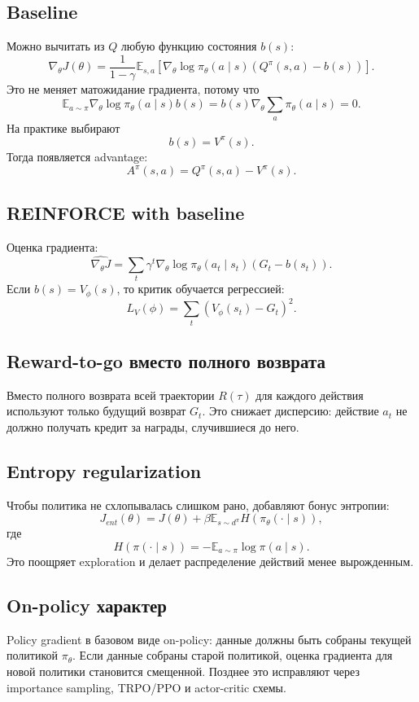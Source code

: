 \documentclass[11pt,a4paper]{article}
\newcommand{\E}{\mathbb{E}}
\newcommand{\1}{\mathbf{1}}
\begin{document}
\subsection*{Baseline}
Можно вычитать из $Q$ любую функцию состояния $b(s)$:
\[
    \nabla_\theta J(\theta)=\frac1{1-\gamma}\E_{s,a}\left[\nabla_\theta\log\pi_\theta(a\mid s)(Q^\pi(s,a)-b(s))\right].
\]
Это не меняет матожидание градиента, потому что
\[
    \E_{a\sim\pi}\nabla_\theta\log\pi_\theta(a\mid s)b(s)=b(s)\nabla_\theta\sum_a\pi_\theta(a\mid s)=0.
\]
На практике выбирают
\[
    b(s)=V^\pi(s).
\]
Тогда появляется advantage:
\[
    A^\pi(s,a)=Q^\pi(s,a)-V^\pi(s).
\]

\subsection*{REINFORCE with baseline}
Оценка градиента:
\[
    \widehat{\nabla_\theta J}=\sum_t\gamma^t
    \nabla_\theta\log\pi_\theta(a_t\mid s_t)(G_t-b(s_t)).
\]
Если $b(s)=V_\phi(s)$, то критик обучается регрессией:
\[
    L_V(\phi)=\sum_t\left(V_\phi(s_t)-G_t\right)^2.
\]

\subsection*{Reward-to-go вместо полного возврата}
Вместо полного возврата всей траектории $R(\tau)$ для каждого действия используют только будущий возврат $G_t$. Это снижает дисперсию: действие $a_t$ не должно получать кредит за награды, случившиеся до него.

\subsection*{Entropy regularization}
Чтобы политика не схлопывалась слишком рано, добавляют бонус энтропии:
\[
    J_{ent}(\theta)=J(\theta)+\beta\E_{s\sim d^\pi}H(\pi_\theta(\cdot\mid s)),
\]
где
\[
    H(\pi(\cdot\mid s))=-\E_{a\sim\pi}\log\pi(a\mid s).
\]
Это поощряет exploration и делает распределение действий менее вырожденным.

\subsection*{On-policy характер}
Policy gradient в базовом виде on-policy: данные должны быть собраны текущей политикой $\pi_\theta$. Если данные собраны старой политикой, оценка градиента для новой политики становится смещенной. Позднее это исправляют через importance sampling, TRPO/PPO и actor-critic схемы.
\end{document}
